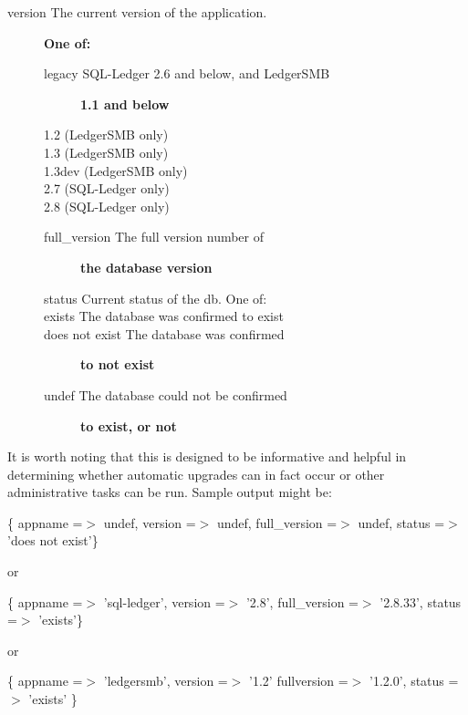 \begin{description}
\begin{description}
\begin{description}
\begin{description}
\begin{description}
\begin{description}
\begin{description}
\begin{description}
\item[{version The current version of the application.}] \textbf{One of:}\begin{description}

\item[{legacy SQL-Ledger 2.6 and below, and LedgerSMB}] \textbf{1.1 and below}
\item[{1.2 (LedgerSMB only)}] \mbox{}
\item[{1.3 (LedgerSMB only)}] \mbox{}
\item[{1.3dev (LedgerSMB only)}] \mbox{}
\item[{2.7 (SQL-Ledger only)}] \mbox{}
\item[{2.8 (SQL-Ledger only)}] \mbox{}\end{description}
\begin{description}

\item[{full\_version The full version number of}] \textbf{the database version}
\item[{status Current status of the db. One of:}] \mbox{}
\item[{exists The database was confirmed to exist}] \mbox{}
\item[{does not exist The database was confirmed}] \textbf{to not exist}
\item[{undef The database could not be confirmed}] \textbf{to exist, or not}\end{description}
\end{description}


It is worth noting that this is designed to be informative and helpful in 
determining whether automatic upgrades can in fact occur or other 
administrative tasks can be run.  Sample output might be:



\{    appname =$>$ undef, 
     version =$>$ undef, 
full\_version =$>$ undef,
      status =$>$ 'does not exist'\}



or



\{    appname =$>$ 'sql-ledger',
     version =$>$ '2.8',
full\_version =$>$ '2.8.33',
      status =$>$ 'exists'\}



or



\{   appname =$>$ 'ledgersmb',
    version =$>$ '1.2'
fullversion =$>$ '1.2.0',
     status =$>$ 'exists' \}




\end{description}
\end{description}
\end{description}
\end{description}
\end{description}
\end{description}
\end{description}
